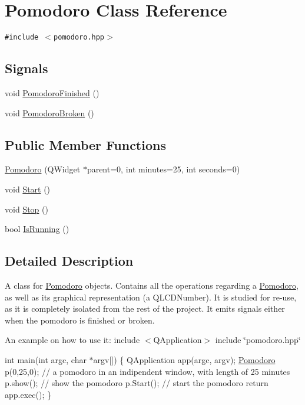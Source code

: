 \hypertarget{classPomodoro}{
\section{Pomodoro Class Reference}
\label{classPomodoro}
}
{\tt \#include $<$pomodoro.hpp$>$}

\subsection*{Signals}
\begin{CompactItemize}
\item 
void \hyperlink{classPomodoro_2e69760ea2e9aeb36093a7e2d64006ce}{PomodoroFinished} ()
\item 
void \hyperlink{classPomodoro_410db1b2329fac39b9788cdd5e5ea9b9}{PomodoroBroken} ()
\end{CompactItemize}
\subsection*{Public Member Functions}
\begin{CompactItemize}
\item 
\hyperlink{classPomodoro_44fec950d9e8157f76fcae92004b084b}{Pomodoro} (QWidget $\ast$parent=0, int minutes=25, int seconds=0)
\item 
void \hyperlink{classPomodoro_2af13c5c3a49855021455665d70e2e1c}{Start} ()
\item 
void \hyperlink{classPomodoro_8188b8c06ba7aef8d8bf808d82944b9d}{Stop} ()
\item 
bool \hyperlink{classPomodoro_61bb61d03bbdf837caf8174220405b7b}{IsRunning} ()
\end{CompactItemize}


\subsection{Detailed Description}
A class for \hyperlink{classPomodoro}{Pomodoro} objects. Contains all the operations regarding a \hyperlink{classPomodoro}{Pomodoro}, as well as its graphical representation (a QLCDNumber). It is studied for re-use, as it is completely isolated from the rest of the project. It emits signals either when the pomodoro is finished or broken.

An example on how to use it: include $<$QApplication$>$ include \char`\"{}pomodoro.hpp\char`\"{}

int main(int argc, char $\ast$argv\mbox{[}\mbox{]}) \{ QApplication app(argc, argv); \hyperlink{classPomodoro}{Pomodoro} p(0,25,0); // a pomodoro in an indipendent window, with length of 25 minutes p.show(); // show the pomodoro p.Start(); // start the pomodoro return app.exec(); \} 

